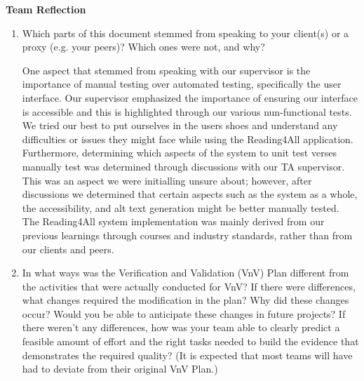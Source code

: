 \documentclass[12pt, titlepage]{article}
\begin{document}
\textbf{Team Reflection}
\begin{enumerate}
  \item Which parts of this document stemmed from speaking to your client(s) or
    a proxy (e.g. your peers)? Which ones were not, and why?

    One aspect that stemmed from speaking with our supervisor is the
    importance of manual testing over automated testing, specifically
    the user interface.
    Our supervisor emphasized the importance of ensuring our
    interface is accessible and this is highlighted through our
    various nun-functional tests.
    We tried our best to put ourselves in the users shoes and
    understand any difficulties or issues they might face while using
    the Reading4All application.
    Furthermore, determining which aspects of the system to unit test
    verses manually test was determined through discussions with our
    TA supervisor. This was an aspect
    we were initialling unsure about; however, after discussions we
    determined that certain aspects such as the system as a whole,
    the accessibility, and alt text generation might be better manually tested.
    The Reading4All system implementation was mainly derived from our
    previous learnings through courses and industry standards, rather
    than from our clients and peers.

  \item In what ways was the Verification and Validation (VnV) Plan different
    from the activities that were actually conducted for VnV?  If there were
    differences, what changes required the modification in the plan?  Why did
    these changes occur?  Would you be able to anticipate these
    changes in future
    projects?  If there weren't any differences, how was your team
    able to clearly
    predict a feasible amount of effort and the right tasks needed to build the
    evidence that demonstrates the required quality?  (It is expected that most
    teams will have had to deviate from their original VnV Plan.)


\end{enumerate}
\end{document}
